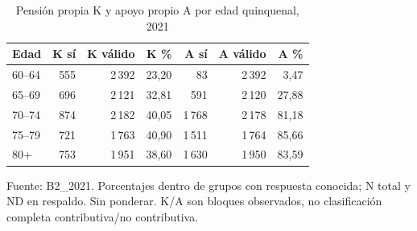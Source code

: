\begin{table}[!htbp]
\centering
\caption{Pensión propia K y apoyo propio A por edad quinquenal, 2021}\label{tab:exploracion-edad}
\small\setlength{\tabcolsep}{4pt}
\renewcommand{\arraystretch}{1.15}
\begin{tabular}{lrrrrrr}
\toprule
\textbf{Edad} & \textbf{K sí} & \textbf{K válido} & \textbf{K \%} & \textbf{A sí} & \textbf{A válido} & \textbf{A \%} \\
\midrule
60--64 & 555 & 2\,392 & 23,20 & 83 & 2\,392 & 3,47 \\
65--69 & 696 & 2\,121 & 32,81 & 591 & 2\,120 & 27,88 \\
70--74 & 874 & 2\,182 & 40,05 & 1\,768 & 2\,178 & 81,18 \\
75--79 & 721 & 1\,763 & 40,90 & 1\,511 & 1\,764 & 85,66 \\
80+ & 753 & 1\,951 & 38,60 & 1\,630 & 1\,950 & 83,59 \\
\bottomrule
\end{tabular}
\par\medskip
\parbox{\linewidth}{\footnotesize Fuente: B2\_2021. Porcentajes dentro de grupos con respuesta conocida; N total y ND en respaldo. Sin ponderar. K/A son bloques observados, no clasificación completa contributiva/no contributiva.}
\end{table}
